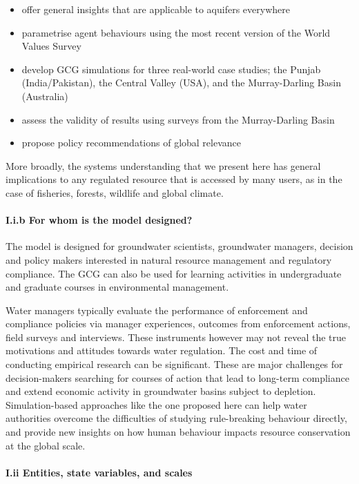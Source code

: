 \documentclass[12pt, a4paper]{article}
\begin{document}
\begin{itemize} \item offer general insights that are applicable to aquifers everywhere \item parametrise agent behaviours using the most recent version of the World Values Survey \item develop GCG simulations for three real-world case studies; the Punjab (India/Pakistan), the Central Valley (USA), and the Murray-Darling Basin (Australia) \item assess the validity of results using surveys from the Murray-Darling Basin \item propose policy recommendations of global relevance \end{itemize}

More broadly, the systems understanding that we present here has general implications to any regulated resource that is accessed by many users, as in the case of fisheries, forests, wildlife and global climate.

\paragraph{I.i.b For whom is the model designed?}

The model is designed for groundwater scientists, groundwater managers, decision and policy makers interested in natural resource management and regulatory compliance. The GCG can also be used for learning activities in undergraduate and graduate courses in environmental management.

Water managers typically evaluate the performance of enforcement and compliance policies via manager experiences, outcomes from enforcement actions, field surveys and interviews. These instruments however may not reveal the true motivations and attitudes towards water regulation. The cost and time of conducting empirical research can be significant. These are major challenges for decision-makers searching for courses of action that lead to long-term compliance and extend economic activity in groundwater basins subject to depletion. Simulation-based approaches like the one proposed here can help water authorities overcome the difficulties of studying rule-breaking behaviour directly, and provide new insights on how human behaviour impacts resource conservation at the global scale.

\paragraph{I.ii Entities, state variables, and scales}
\end{document}
